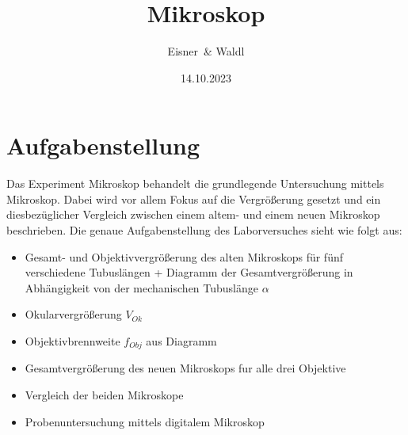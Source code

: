 \documentclass[12pt,a4paper,twoside]{article}
\begin{document}
\newcommand\laboratorynumber{2}
\title{Mikroskop}
\newcommand\supervisor{Nico Knefz}
\newcommand\groupnumber{42}

\newcommand\participantonelastname{Eisner}
\newcommand\participantonefirstname{Nico}
\newcommand\participantoneid{12214121}
\newcommand\participanttwolastname{Waldl}
\newcommand\participanttwofirstname{Philip}
\newcommand\participanttwoid{12214120}
\author{\participantonelastname \ \& \participanttwolastname}

\newcommand\degreeid{UB 033 678}
\newcommand\semester{23WS}
\date{14.10.2023}

\newcommand\coursetitle{Laborübungen 2: \\ Elektrizität, Magnetismus, Optik}

%



\tableofcontents
\newpage

\section{Aufgabenstellung} %
Das Experiment Mikroskop behandelt die grundlegende Untersuchung mittels Mikroskop. 
Dabei wird vor allem Fokus auf die Vergrößerung gesetzt und ein diesbezüglicher Vergleich zwischen einem altem- und einem neuen Mikroskop beschrieben.
Die genaue Aufgabenstellung des Laborversuches sieht wie folgt aus:

\begin{itemize}
    \item Gesamt- und Objektivvergrößerung des alten Mikroskops für fünf verschiedene Tubuslängen 
    + Diagramm der Gesamtvergrößerung in Abhängigkeit von der mechanischen Tubuslänge 
    $\alpha$
    \item Okularvergrößerung $V_{Ok}$ 
    \item Objektivbrennweite $f_{Obj}$ aus Diagramm
    \item Gesamtvergrößerung des neuen Mikroskops fur alle drei Objektive
    \item Vergleich der beiden Mikroskope
    \item Probenuntersuchung mittels digitalem Mikroskop
\end{itemize}
\end{document}
